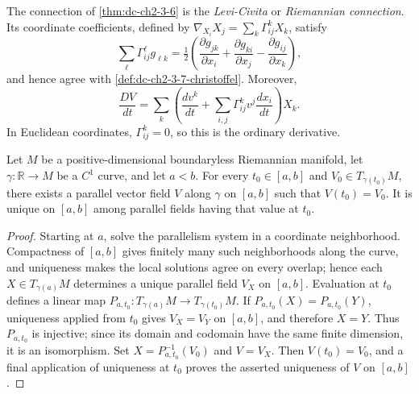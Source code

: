 \begin{remark}
  \label{rem:dc-ch2-3-7}


  The connection of \cref{thm:dc-ch2-3-6} is the \emph{Levi-Civita} or
  \emph{Riemannian connection}. Its coordinate coefficients, defined by
  $\nabla_{X_i}X_j=\sum_k\Gamma_{ij}^kX_k$, satisfy
  \[
    \sum_\ell\Gamma_{ij}^\ell g_{\ell k}
      =\tfrac12\left(
        \frac{\partial g_{jk}}{\partial x_i}
       +\frac{\partial g_{ki}}{\partial x_j}
       -\frac{\partial g_{ij}}{\partial x_k}\right),
  \]
  and hence agree with \cref{def:dc-ch2-3-7-christoffel}. Moreover,
  \[
    \frac{DV}{dt}
      =\sum_k\left(\frac{dv^k}{dt}
        +\sum_{i,j}\Gamma_{ij}^kv^j\frac{dx_i}{dt}\right)X_k.
  \]
  In Euclidean coordinates, $\Gamma_{ij}^k=0$, so this is the ordinary
  derivative.
\end{remark}

\begin{proposition}
  \label{prop:dc-ch2-2-6-riemannian}


  Let $M$ be a positive-dimensional boundaryless Riemannian manifold, let
  $\gamma:\mathbb{R}\to M$ be a $C^1$ curve, and let $a<b$. For every
  $t_0\in[a,b]$ and $V_0\in T_{\gamma(t_0)}M$, there exists a parallel vector
  field $V$ along $\gamma$ on $[a,b]$ such that $V(t_0)=V_0$. It is unique on
  $[a,b]$ among parallel fields having that value at $t_0$.
\end{proposition}
\begin{proof}

  Starting at $a$, solve the parallelism system in a coordinate neighborhood.
  Compactness of $[a,b]$ gives finitely many such neighborhoods along the curve,
  and uniqueness makes the local solutions agree on every overlap; hence each
  $X\in T_{\gamma(a)}M$ determines a unique parallel field $V_X$ on $[a,b]$.
  Evaluation at $t_0$ defines a linear map
  $P_{a,t_0}:T_{\gamma(a)}M\to T_{\gamma(t_0)}M$. If
  $P_{a,t_0}(X)=P_{a,t_0}(Y)$, uniqueness applied from $t_0$ gives
  $V_X=V_Y$ on $[a,b]$, and therefore $X=Y$. Thus $P_{a,t_0}$ is injective;
  since its domain and codomain have the same finite dimension, it is an
  isomorphism. Set $X=P_{a,t_0}^{-1}(V_0)$ and $V=V_X$. Then
  $V(t_0)=V_0$, and a final application of uniqueness at $t_0$ proves the
  asserted uniqueness of $V$ on $[a,b]$.
\end{proof}
